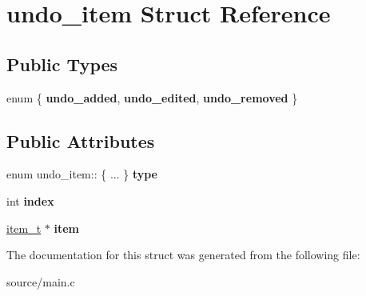 \hypertarget{structundo__item}{}\section{undo\+\_\+item Struct Reference}
\label{structundo__item}
\subsection*{Public Types}
\begin{DoxyCompactItemize}
\item 
enum \{ {\bfseries undo\+\_\+added}, 
{\bfseries undo\+\_\+edited}, 
{\bfseries undo\+\_\+removed}
 \}\hypertarget{structundo__item_a527f82d45b87a81272a1d38da91634fd}{}\label{structundo__item_a527f82d45b87a81272a1d38da91634fd}

\end{DoxyCompactItemize}
\subsection*{Public Attributes}
\begin{DoxyCompactItemize}
\item 
enum undo\+\_\+item\+:: \{ ... \}  {\bfseries type}\hypertarget{structundo__item_a01af4c4ea98c2ec146f322c4e445cd82}{}\label{structundo__item_a01af4c4ea98c2ec146f322c4e445cd82}

\item 
int {\bfseries index}\hypertarget{structundo__item_a202a68820a773dd867196c2d22bc75aa}{}\label{structundo__item_a202a68820a773dd867196c2d22bc75aa}

\item 
\hyperlink{structitem}{item\+\_\+t} $\ast$ {\bfseries item}\hypertarget{structundo__item_a73933b28089171d3f6e3c57d19e06afd}{}\label{structundo__item_a73933b28089171d3f6e3c57d19e06afd}

\end{DoxyCompactItemize}


The documentation for this struct was generated from the following file\+:\begin{DoxyCompactItemize}
\item 
source/main.\+c\end{DoxyCompactItemize}
